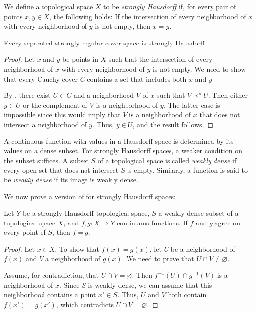 \documentclass[reqno]{amsart}
\theoremstyle{definition}
\theoremstyle{remark}
\numberwithin{figure}{section}
\newcommand{\rb}{\prec}
\begin{document}
We define a topological space $X$ to be \emph{strongly Hausdorff} if, for every pair of points $x,y \in X$, the following holds:
If the intersection of every neighborhood of $x$ with every neighborhood of $y$ is not empty, then $x = y$.

\begin{lem}
Every separated strongly regular cover space is strongly Hausdorff.
\end{lem}
\begin{proof}
Let $x$ and $y$ be points in $X$ such that the intersection of every neighborhood of $x$ with every neighborhood of $y$ is not empty.
We need to show that every Cauchy cover $C$ contains a set that includes both $x$ and $y$. 

By , there exist $U \in C$ and a neighborhood $V$ of $x$ such that $V \rb^s U$.
Then either $y \in U$ or the complement of $V$ is a neighborhood of $y$.
The latter case is impossible since this would imply that $V$ is a neighborhood of $x$ that does not intersect a neighborhood of $y$.
Thus, $y \in U$, and the result follows.
\end{proof}

A continuous function with values in a Hausdorff space is determined by its values on a dense subset.
For strongly Hausdorff spaces, a weaker condition on the subset suffices.
A subset $S$ of a topological space is called \emph{weakly dense} if every open set that does not intersect $S$ is empty.
Similarly, a function is said to be \emph{weakly dense} if its image is weakly dense. 

We now prove a version of  for strongly Hausdorff spaces:

\begin{prop}
Let $Y$ be a strongly Hausdorff topological space, $S$ a weakly dense subset of a topological space $X$, and $f,g : X \to Y$ continuous functions.
If $f$ and $g$ agree on every point of $S$, then $f = g$.
\end{prop}
\begin{proof}
Let $x \in X$.
To show that $f(x) = g(x)$, let $U$ be a neighborhood of $f(x)$ and $V$ a neighborhood of $g(x)$.
We need to prove that $U \cap V \neq \varnothing$. 

Assume, for contradiction, that $U \cap V = \varnothing$.
Then $f^{-1}(U) \cap g^{-1}(V)$ is a neighborhood of $x$.
Since $S$ is weakly dense, we can assume that this neighborhood contains a point $x' \in S$.
Thus, $U$ and $V$ both contain $f(x') = g(x')$, which contradicts $U \cap V = \varnothing$.
\end{proof}
\end{document}
